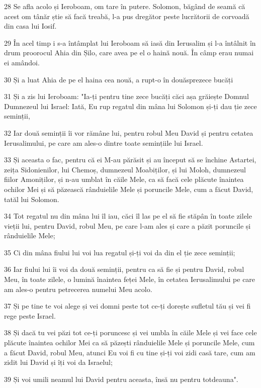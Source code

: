 \par 28 Se afla acolo și Ieroboam, om tare în putere. Solomon, băgând de seamă că acest om tânăr știe să facă treabă, l-a pus dregător peste lucrătorii de corvoadă din casa lui Iosif.
\par 29 În acel timp i s-a întâmplat lui Ieroboam să iasă din Ierusalim și l-a întâlnit în drum proorocul Ahia din Șilo, care avea pe el o haină nouă. În câmp erau numai ei amândoi.
\par 30 Și a luat Ahia de pe el haina cea nouă, a rupt-o în douăsprezece bucăți
\par 31 Și a zis lui Ieroboam: "Ia-ți pentru tine zece bucăți căci așa grăiește Domnul Dumnezeul lui Israel: Iată, Eu rup regatul din mâna lui Solomon și-ți dau ție zece seminții,
\par 32 Iar două seminții îi vor rămâne lui, pentru robul Meu David și pentru cetatea Ierusalimului, pe care am ales-o dintre toate semințiile lui Israel.
\par 33 Și aceasta o fac, pentru că ei M-au părăsit și au început să se închine Astartei, zeița Sidonienilor, lui Chemoș, dumnezeul Moabiților, și lui Moloh, dumnezeul fiilor Amoniților, și n-au umblat în căile Mele, ca să facă cele plăcute înaintea ochilor Mei și să păzească rânduielile Mele și poruncile Mele, cum a făcut David, tatăl lui Solomon.
\par 34 Tot regatul nu din mâna lui îl iau, căci îl las pe el să fie stăpân în toate zilele vieții lui, pentru David, robul Meu, pe care l-am ales și care a păzit poruncile și rânduielile Mele;
\par 35 Ci din mâna fiului lui voi lua regatul și-ți voi da din el ție zece seminții;
\par 36 Iar fiului lui îi voi da două seminții, pentru ca să fie și pentru David, robul Meu, în toate zilele, o lumină înaintea feței Mele, în cetatea Ierusalimului pe care am ales-o pentru petrecerea numelui Meu acolo.
\par 37 Și pe tine te voi alege și vei domni peste tot ce-ți dorește sufletul tău și vei fi rege peste Israel.
\par 38 Și dacă tu vei păzi tot ce-ți poruncesc și vei umbla în căile Mele și vei face cele plăcute înaintea ochilor Mei ca să păzești rânduielile Mele și poruncile Mele, cum a făcut David, robul Meu, atunci Eu voi fi cu tine și-ți voi zidi casă tare, cum am zidit lui David și îți voi da Israelul;
\par 39 Și voi umili neamul lui David pentru aceasta, însă nu pentru totdeauna".
